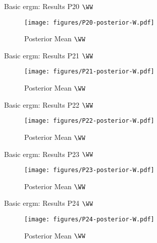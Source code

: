 \documentclass{beamer}
\begin{document}
\begin{frame}{Basic \acrshort{ergm}: Results P20 $\WW$}
	\begin{figure}[H]
		\centering
		\texttt{[image: figures/P20-posterior-W.pdf]}
		\caption{Posterior Mean $\WW$}
	\end{figure}
\end{frame}

\begin{frame}{Basic \acrshort{ergm}: Results P21 $\WW$}
	\begin{figure}[H]
		\centering
		\texttt{[image: figures/P21-posterior-W.pdf]}
		\caption{Posterior Mean $\WW$}
	\end{figure}
\end{frame}

\begin{frame}{Basic \acrshort{ergm}: Results P22 $\WW$}
	\begin{figure}[H]
		\centering
		\texttt{[image: figures/P22-posterior-W.pdf]}
		\caption{Posterior Mean $\WW$}
	\end{figure}
\end{frame}

\begin{frame}{Basic \acrshort{ergm}: Results P23 $\WW$}
	\begin{figure}[H]
		\centering
		\texttt{[image: figures/P23-posterior-W.pdf]}
		\caption{Posterior Mean $\WW$}
	\end{figure}
\end{frame}

\begin{frame}{Basic \acrshort{ergm}: Results P24 $\WW$}
	\begin{figure}[H]
		\centering
		\texttt{[image: figures/P24-posterior-W.pdf]}
		\caption{Posterior Mean $\WW$}
	\end{figure}
\end{frame}
\end{document}
